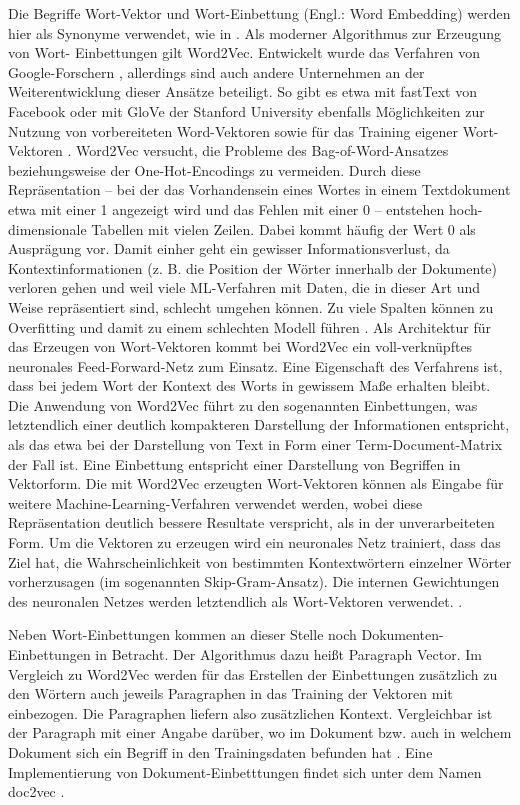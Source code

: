 Die Begriffe Wort-Vektor und Wort-Einbettung (Engl.: Word Embedding) werden hier als Synonyme verwendet, wie in \cite[S. 38]{White}. Als moderner Algorithmus zur Erzeugung von Wort- Einbettungen gilt Word2Vec. Entwickelt wurde das Verfahren von Google-Forschern \cite{mikolov2013}, allerdings sind auch andere Unternehmen an der Weiterentwicklung dieser Ansätze beteiligt. So gibt es etwa mit fastText von Facebook oder mit GloVe der Stanford University ebenfalls Möglichkeiten zur Nutzung von vorbereiteten Word-Vektoren sowie für das Training eigener Wort-Vektoren \cite{facebook} \cite{stanford}.
Word2Vec versucht, die Probleme des Bag-of-Word-Ansatzes beziehungsweise der One-Hot-Encodings zu vermeiden. Durch diese Repräsentation – bei der das Vorhandensein eines Wortes in einem Textdokument etwa mit einer 1 angezeigt wird und das Fehlen mit einer 0 – entstehen hoch-dimensionale Tabellen mit vielen Zeilen. Dabei kommt häufig der Wert 0 als Ausprägung vor. Damit einher geht ein gewisser Informationsverlust, da Kontextinformationen (z. B. die Position der Wörter innerhalb der Dokumente) verloren gehen  und weil viele ML-Verfahren mit Daten, die in dieser Art und Weise repräsentiert sind, schlecht umgehen können. Zu viele Spalten können zu Overfitting  und damit zu einem schlechten Modell führen \cite[S. 145]{knime}. Als Architektur für das Erzeugen von Wort-Vektoren kommt bei Word2Vec ein voll-verknüpftes neuronales Feed-Forward-Netz zum Einsatz. Eine Eigenschaft des Verfahrens ist, dass bei jedem Wort der Kontext des Worts in gewissem Maße erhalten bleibt. Die Anwendung von Word2Vec führt zu den sogenannten Einbettungen, was letztendlich einer deutlich kompakteren Darstellung der Informationen entspricht, als das etwa bei der Darstellung von Text in Form einer Term-Document-Matrix der Fall ist. Eine Einbettung entspricht einer Darstellung von Begriffen in Vektorform. Die mit Word2Vec erzeugten Wort-Vektoren können als Eingabe für weitere Machine-Learning-Verfahren verwendet werden, wobei diese Repräsentation deutlich bessere Resultate verspricht, als in der unverarbeiteten Form. Um die Vektoren zu erzeugen wird ein neuronales Netz trainiert, dass das Ziel hat, die Wahrscheinlichkeit von bestimmten Kontextwörtern einzelner Wörter vorherzusagen (im sogenannten Skip-Gram-Ansatz). Die internen Gewichtungen des neuronalen Netzes werden letztendlich als Wort-Vektoren verwendet. \cite[S. 148-160]{knime}. 

Neben Wort-Einbettungen kommen an dieser Stelle noch Dokumenten-Einbettungen in Betracht. Der Algorithmus dazu heißt Paragraph Vector. Im Vergleich zu Word2Vec werden für das Erstellen der Einbettungen zusätzlich zu den Wörtern auch jeweils Paragraphen in das Training der Vektoren mit einbezogen. Die Paragraphen liefern also zusätzlichen Kontext. Vergleichbar ist der Paragraph mit einer Angabe darüber, wo im Dokument bzw. auch in welchem Dokument sich ein Begriff in den Trainingsdaten befunden hat \cite{mikolov2014}. Eine Implementierung von Dokument-Einbetttungen findet sich unter dem Namen doc2vec \cite{rehurek}.

